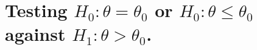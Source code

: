 \chapter{Testing \texorpdfstring{$H_0:\theta = \theta_0$}{h0} or \texorpdfstring{$H_0:\theta \le
\theta_0$}{h1} against \texorpdfstring{$H_1:\theta > \theta_0$}{h1}.}
